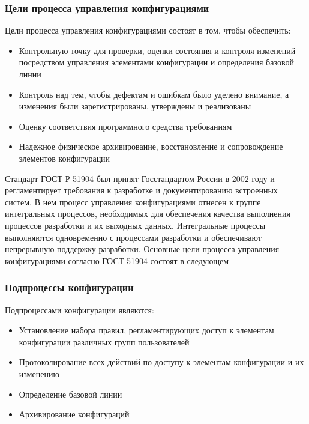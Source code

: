 \documentclass{../industrial-development}
\begin{document}
\begin{frame} \frametitle{Цели процесса управления конфигурациями}
	   \begin{block}{Цели процесса управления конфигурациями состоят в том, чтобы обеспечить:}
  		 \begin{itemize}
			\item Контрольную точку для проверки, оценки состояния и контроля изменений посредством управления элементами конфигурации и определения базовой линии
		\item Контроль над тем, чтобы дефектам и ошибкам было уделено внимание, а изменения были зарегистрированы, утверждены и реализованы
\item Оценку соответствия программного средства требованиям
\item Надежное физическое архивирование, восстановление и сопровождение элементов конфигурации
  \end{itemize}
 \end{block}
\end{frame}

\lecturenotes
Стандарт ГОСТ Р 51904 был принят Госстандартом России в 2002 году и регламентирует требования к разработке и документированию встроенных систем. В нем процесс управления конфигурациями отнесен к группе интегральных процессов, необходимых для обеспечения качества выполнения процессов разработки и их выходных данных. Интегральные процессы выполняются одновременно с процессами разработки и обеспечивают непрерывную поддержку разработки. Основные цели процесса управления конфигурациями согласно ГОСТ 51904 состоят в следующем
~\cite{Standarts}

\begin{frame} \frametitle{Подпроцессы конфигурации}
  \begin{block}{Подпроцессами конфигурации являются:}
  		 \begin{itemize}
\item Установление набора правил, регламентирующих доступ к элементам конфигурации различных групп пользователей
\item Протоколирование всех действий по доступу к элементам конфигурации и их изменению
\item Определение базовой линии 
\item Архивирование конфигураций
  \end{itemize}
 \end{block}
\end{frame}
\end{document}
